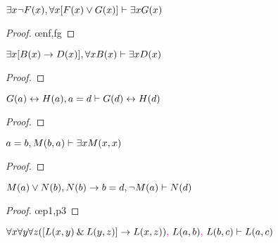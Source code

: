 \begin{earg}
\item $\exists x {\neg} F(x), \forall x[F(x) \vee G(x)] \vdash \exists xG(x)$

\begin{proof}
	 \pr{}
	 \pr{}
	\open
		 \as{}
		 
		 \oe{nf,fg}
		 
	\close
	 
\end{proof}
\bigskip

\begin{minipage}{10cm}
\item $\exists x[B(x) \rightarrow D(x)], \forall xB(x) \vdash \exists xD(x)$

\begin{proof}
	 \pr{}
	 \pr{}
	\open
		 \as{}
		 
		 
		 
	\close
	 
\end{proof}
\bigskip
\end{minipage}

\item $G(a) \leftrightarrow H(a), a=d \vdash G(d) \leftrightarrow H(d)$

\begin{proof}
	 \pr{}
	 \pr{}
	 
\end{proof}
\bigskip

\item $a=b, M(b,a) \vdash \exists xM(x,x)$

\begin{proof}
	 \pr{}
	 \pr{}
	 
	 
\end{proof}
\bigskip


\item $M(a) \vee N(b) , N(b) \rightarrow b=d, {\neg} M(a)  \vdash N(d)$

\begin{proof}
	 \pr{}
	 \pr{}
	 \pr{}
	 \oe{p1,p3}
	 
	 
\end{proof}
\bigskip


\item $\forall x \forall y \forall z([L(x,y) \mathbin{\&} L(y,z)] \rightarrow L(x,z))\textcolor{magenta}{,}~ L(a,b)\textcolor{magenta}{,}~ L(b,c) \vdash L(a,c)$
\end{earg}


